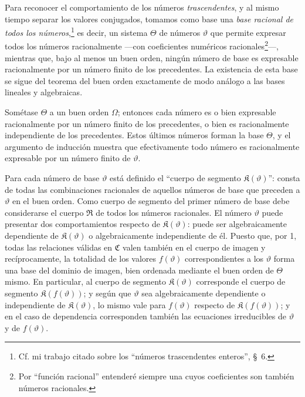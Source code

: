 Para reconocer el comportamiento de los números \emph{trascendentes}, y al mismo tiempo separar los valores conjugados, tomamos como base una \emph{base racional de todos los números},\footnote{Cf. mi trabajo citado sobre los ``números trascendentes enteros'', \S\ 6.} es decir, un sistema $\Theta$ de números $\vartheta$ que permite expresar todos los números racionalmente ---con coeficientes numéricos racionales\footnote{Por ``función racional'' entenderé siempre una cuyos coeficientes son también números racionales.}---, mientras que, bajo al menos un buen orden, ningún número de base es expresable racionalmente por un número finito de los precedentes. La existencia de esta base se sigue del teorema del buen orden exactamente de modo análogo a las bases lineales y algebraicas.

Sométase $\Theta$ a un buen orden $\Omega$; entonces cada número es o bien expresable racionalmente por un número finito de los precedentes, o bien es racionalmente independiente de los precedentes. Estos últimos números forman la base $\Theta$, y el argumento de inducción muestra que efectivamente todo número es racionalmente expresable por un número finito de $\vartheta$.

Para cada número de base $\vartheta$ está definido el ``cuerpo de segmento $\mathfrak K(\vartheta)$'': consta de todas las combinaciones racionales de aquellos números de base que preceden a $\vartheta$ en el buen orden. Como cuerpo de segmento del primer número de base debe considerarse el cuerpo $\mathfrak R$ de todos los números racionales. El número $\vartheta$ puede presentar dos comportamientos respecto de $\mathfrak K(\vartheta)$: puede ser algebraicamente dependiente de $\mathfrak K(\vartheta)$ o algebraicamente independiente de él. Puesto que, por 1, todas las relaciones válidas en $\mathfrak C$ valen también en el cuerpo de imagen y recíprocamente, la totalidad de los valores $f(\vartheta)$ correspondientes a los $\vartheta$ forma una base del dominio de imagen, bien ordenada mediante el buen orden de $\Theta$ mismo. En particular, al cuerpo de segmento $\mathfrak K(\vartheta)$ corresponde el cuerpo de segmento $\mathfrak K(f(\vartheta))$; y según que $\vartheta$ sea algebraicamente dependiente o independiente de $\mathfrak K(\vartheta)$, lo mismo vale para $f(\vartheta)$ respecto de $\mathfrak K(f(\vartheta))$; y en el caso de dependencia corresponden también las ecuaciones irreducibles de $\vartheta$ y de $f(\vartheta)$.

